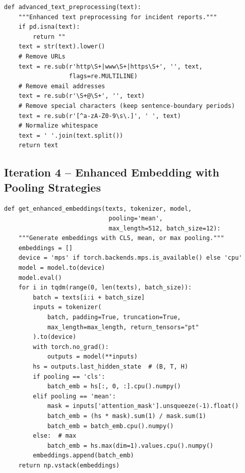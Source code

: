 \documentclass[11pt, titlepage, bibliography=totoc]{scrreprt}
\begin{document}
\begin{lstlisting}[label=lst:text-preprocessing,
  caption={Advanced text preprocessing applied to incident report fields in Iteration~4.}]
def advanced_text_preprocessing(text):
    """Enhanced text preprocessing for incident reports."""
    if pd.isna(text):
        return ""
    text = str(text).lower()
    # Remove URLs
    text = re.sub(r'http\S+|www\S+|https\S+', '', text,
                  flags=re.MULTILINE)
    # Remove email addresses
    text = re.sub(r'\S+@\S+', '', text)
    # Remove special characters (keep sentence-boundary periods)
    text = re.sub(r'[^a-zA-Z0-9\s\.]', ' ', text)
    # Normalize whitespace
    text = ' '.join(text.split())
    return text
\end{lstlisting}

\subsection*{Iteration 4 -- Enhanced Embedding with Pooling Strategies}

\begin{lstlisting}[label=lst:enhanced-embedding,
  caption={Enhanced embedding generation supporting CLS, mean, and max pooling strategies (Iteration~4).}]
def get_enhanced_embeddings(texts, tokenizer, model,
                             pooling='mean',
                             max_length=512, batch_size=12):
    """Generate embeddings with CLS, mean, or max pooling."""
    embeddings = []
    device = 'mps' if torch.backends.mps.is_available() else 'cpu'
    model = model.to(device)
    model.eval()
    for i in tqdm(range(0, len(texts), batch_size)):
        batch = texts[i:i + batch_size]
        inputs = tokenizer(
            batch, padding=True, truncation=True,
            max_length=max_length, return_tensors="pt"
        ).to(device)
        with torch.no_grad():
            outputs = model(**inputs)
        hs = outputs.last_hidden_state  # (B, T, H)
        if pooling == 'cls':
            batch_emb = hs[:, 0, :].cpu().numpy()
        elif pooling == 'mean':
            mask = inputs['attention_mask'].unsqueeze(-1).float()
            batch_emb = (hs * mask).sum(1) / mask.sum(1)
            batch_emb = batch_emb.cpu().numpy()
        else:  # max
            batch_emb = hs.max(dim=1).values.cpu().numpy()
        embeddings.append(batch_emb)
    return np.vstack(embeddings)
\end{lstlisting}
\end{document}
